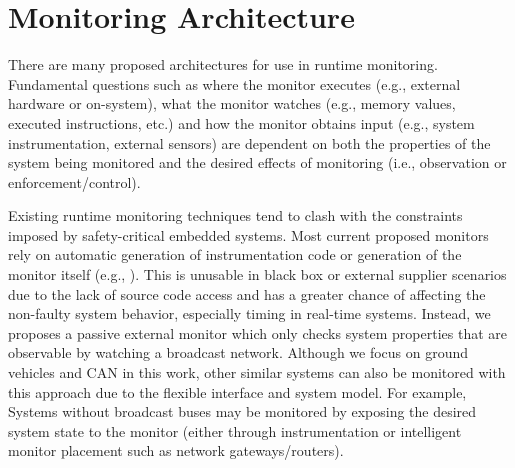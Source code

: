 
\section{Monitoring Architecture}
There are many proposed architectures for use in runtime monitoring. Fundamental questions such as where the monitor executes (e.g., external hardware or on-system), what the monitor watches (e.g., memory values, executed instructions, etc.) and how the monitor obtains input (e.g., system instrumentation, external sensors) are dependent on both the properties of the system being monitored and the desired effects of monitoring (i.e., observation or enforcement/control).  

Existing runtime monitoring techniques tend to clash with the constraints imposed by safety-critical embedded systems. 
Most current proposed monitors rely on automatic generation of instrumentation code or generation of the monitor itself (e.g., \cite{Havelund2002, Pike2011}).
This is unusable in black box or external supplier scenarios due to the lack of source code access and has a greater chance of affecting the non-faulty system behavior, especially timing in real-time systems.
Instead, we proposes a passive external monitor which only checks system properties that are observable by watching a broadcast network.
Although we focus on ground vehicles and CAN in this work, other similar systems can also be monitored with this approach due to the flexible interface and system model.
For example, Systems without broadcast buses may be monitored by exposing the desired system state to the monitor (either through instrumentation or intelligent monitor placement such as network gateways/routers).

